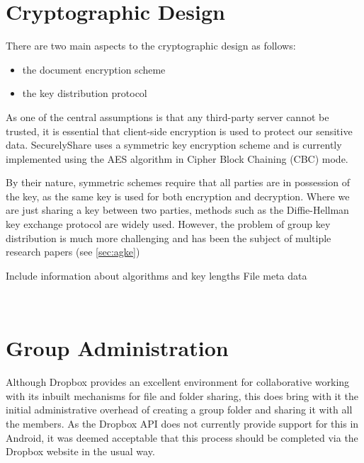 \section{Cryptographic Design}
\label{sec:crypto}

There are two main aspects to the cryptographic design as follows:
\begin{itemize}
\item the document encryption scheme
\item the key distribution protocol
\end{itemize} 

As one of the central assumptions is that any third-party server cannot be trusted, it is essential that client-side encryption is used to protect our sensitive data.  SecurelyShare uses a symmetric key encryption scheme and is currently implemented using the AES algorithm in Cipher Block Chaining (CBC) mode.

By their nature, symmetric  schemes require that all parties are in possession of the key, as the same key is used for both encryption and decryption.  Where we are just sharing a key between two parties, methods such as the Diffie-Hellman key exchange protocol \cite{dh1976}  are widely used.  However, the problem of group key distribution is much more challenging and has been the subject of multiple research papers (see  \ref{sec:agke})

Include information about algorithms and key lengths
File meta data


\\




\section{Group Administration}

Although Dropbox provides an excellent environment for collaborative working with its inbuilt mechanisms for file and folder sharing, this does bring with it the initial administrative overhead of creating a group folder and sharing it with all the members.  As the Dropbox API does not currently provide support for  this in Android, it was deemed acceptable that this process should be completed via the Dropbox website in the usual way.  

